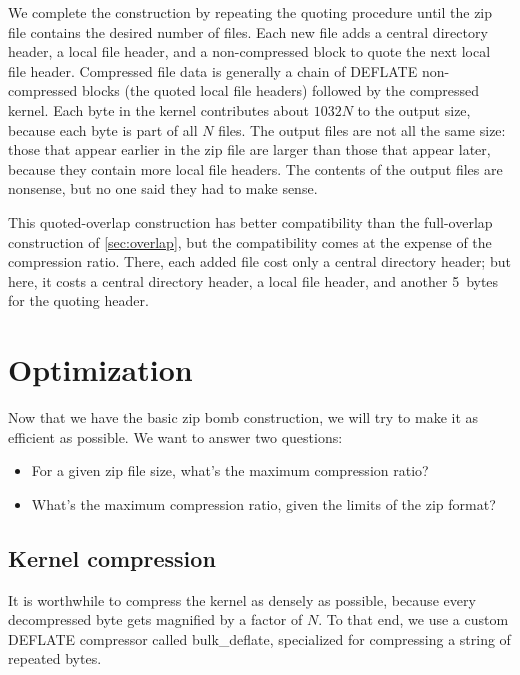 \documentclass[letterpaper,twocolumn,10pt]{article}
\newcommand{\bulkdeflate}{\mbox{bulk\_deflate}}
\begin{document}
We complete the construction by repeating the quoting procedure
until the zip file contains the desired number of files.
Each new file adds a central directory header,
a local file header,
and a non-compressed block to quote the next local file header.
Compressed file data is generally a chain of DEFLATE non-compressed blocks
(the quoted local file headers)
followed by the compressed kernel.
Each byte in the kernel contributes about
$\num{1032}N$ to the output size,
because each byte is part of all $N$ files.
The output files are not all the same size:
those that appear earlier in the zip file
are larger than those that appear later,
because they contain more local file headers.
The contents of the output files are nonsense,
but no one said they had to make sense.

This quoted-overlap construction has better compatibility
than the full-overlap construction of \autoref{sec:overlap},
but the compatibility comes at the expense of the compression ratio.
There, each added file cost only a central directory header;
but here, it costs a central directory header,
a local file header,
and another \SI{5}{bytes} for the quoting header.


\section{Optimization}
\label{sec:optimization}

Now that we have the basic zip bomb construction,
we will try to make it as efficient as possible.
We want to answer two questions:

\begin{itemize}
\item For a given zip file size, what's the maximum compression ratio?
\item What's the maximum compression ratio, given the limits of the zip format?
\end{itemize}

\subsection{Kernel compression}
\label{sec:bulkdeflate}

It is worthwhile to compress the kernel as densely as possible,
because every decompressed byte gets magnified by a factor of $N$.
To that end, we use a custom DEFLATE compressor
called \bulkdeflate,
specialized for compressing
a string of repeated bytes.

\end{document}
